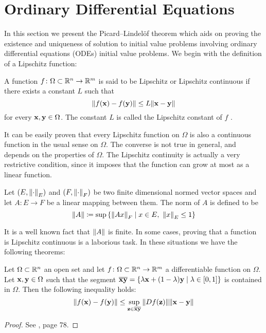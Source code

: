
\section{Ordinary Differential Equations}

In this section we present the Picard--Lindelöf theorem which aids on proving the existence and uniqueness of solution to initial value problems involving ordinary differential equations (ODEs) initial value problems. We begin with the definition of a Lipschitz function:

\begin{definition}
	A function $f \colon \Omega \subset \mathbb{R}^n \rightarrow \mathbb{R}^m$ is said to be Lipschitz or Lipschitz continuous if there exists a constant $L$ such that
	\begin{equation}
		\norm{f(\vb{x}) - f(\vb{y})} \leq L \norm{\vb{x} - \vb{y}}
	\end{equation}
	for every $\vb{x}, \vb{y} \in \Omega$. The constant $L$ is called the Lipschitz constant of $f$ \cite{salsa2009chap1}.
\end{definition}

It can be easily proven that every Lipschitz function on $\Omega$ is also a continuous function in the usual sense on $\Omega$. The converse is not true in general, and depends on the properties of $\Omega$. The Lipschitz continuity is actually a very restrictive condition, since it imposes that the function can grow at most as a linear function. 

\begin{definition}
	Let $(E, \norm{\cdot}_E)$ and $(F, \norm{\cdot}_F)$ be two finite dimensional normed vector spaces and let $A \colon E \rightarrow F$ be a linear mapping between them. The norm of $A$ is defined to be
	\begin{equation}
		\norm{A}
		\coloneqq
		\sup{\left\{ \norm{A x}_F \mid x \in E, \ \norm{x}_E \leq 1 \right\}}
	\end{equation}
\end{definition}

\noindent
It is a well known fact that $\norm{A}$ is finite. In some cases, proving that a function is Lipschitz continuous is a laborious task. In these situations we have the following theorems:

\begin{theorem} \label{teo:corollary_mean_value_theorem}
	Let $\Omega \subset \mathbb{R}^n$ an open set and let $f \colon \Omega \subset \mathbb{R}^n \to \mathbb{R}^m$ a differentiable function on $\Omega$. Let $\vb{x}, \vb{y} \in \Omega$ such that the segment $\overline{\vb{x}\vb{y}} = \{ \lambda \vb{x} + (1 - \lambda) \vb{y} \mid \lambda \in [0, 1] \}$ is contained in $\Omega$. Then the following inequality holds:
	\begin{equation}
		\norm{f(\vb{x}) - f(\vb{y})} \leq \sup_{\vb{z} \in 
		\overline{\vb{x}\vb{y}}} \norm{D f(\vb{z})} \norm{\vb{x} - \vb{y}}
	\end{equation}
\end{theorem}
\begin{proof}
	See \cite{mazon2008calculo}, page 78.
\end{proof}

